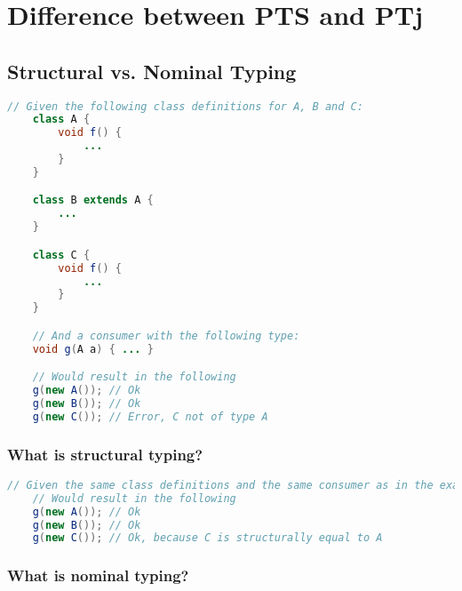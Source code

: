
\chapter{Difference between PTS and PTj}\label{ch:difference-between-pts-and-ptj}


\section{Structural vs. Nominal Typing}\label{sec:structural-vs-nominal-typing}

\begin{lstlisting}[label={lst:nominal-typing-example}, language=Java]
    // Given the following class definitions for A, B and C:
    class A {
        void f() {
            ...
        }
    }

    class B extends A {
        ...
    }

    class C {
        void f() {
            ...
        }
    }

    // And a consumer with the following type:
    void g(A a) { ... }

    // Would result in the following
    g(new A()); // Ok
    g(new B()); // Ok
    g(new C()); // Error, C not of type A
\end{lstlisting}

\subsection{What is structural typing?}\label{subsec:what-is-structural-typing?}

\begin{lstlisting}[label={lst:structural-typing-example2}, language=Java]
    // Given the same class definitions and the same consumer as in the example above.
    // Would result in the following
    g(new A()); // Ok
    g(new B()); // Ok
    g(new C()); // Ok, because C is structurally equal to A
\end{lstlisting}

\subsection{What is nominal typing?}\label{subsec:what-is-nominal-typing?}

